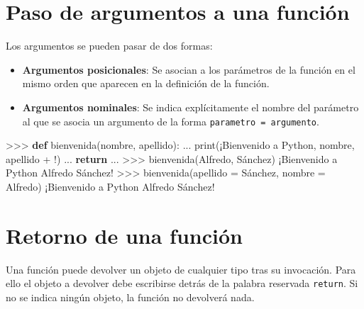 \documentclass[
  spanish,
  a4paper,
]{scrreport}
\newenvironment{Shaded}{\begin{snugshade}}{\end{snugshade}}
\newcommand{\BuiltInTok}[1]{\textcolor[rgb]{0.00,0.23,0.31}{#1}}
\newcommand{\ControlFlowTok}[1]{\textcolor[rgb]{0.00,0.23,0.31}{\textbf{#1}}}
\newcommand{\ErrorTok}[1]{\textcolor[rgb]{0.68,0.00,0.00}{#1}}
\newcommand{\KeywordTok}[1]{\textcolor[rgb]{0.00,0.23,0.31}{\textbf{#1}}}
\newcommand{\NormalTok}[1]{\textcolor[rgb]{0.00,0.23,0.31}{#1}}
\newcommand{\OperatorTok}[1]{\textcolor[rgb]{0.37,0.37,0.37}{#1}}
\newcommand{\StringTok}[1]{\textcolor[rgb]{0.13,0.47,0.30}{#1}}
\providecommand{\tightlist}{%
  \setlength{\itemsep}{0pt}\setlength{\parskip}{0pt}}
\begin{document}
\section{Paso de argumentos a una
función}\label{paso-de-argumentos-a-una-funciuxf3n}

Los argumentos se pueden pasar de dos formas:

\begin{itemize}
\tightlist
\item
  \textbf{Argumentos posicionales}: Se asocian a los parámetros de la
  función en el mismo orden que aparecen en la definición de la función.
\item
  \textbf{Argumentos nominales}: Se indica explícitamente el nombre del
  parámetro al que se asocia un argumento de la forma
  \texttt{parametro\ =\ argumento}.
\end{itemize}

\begin{Shaded}
\begin{Highlighting}[]
\OperatorTok{\textgreater{}\textgreater{}\textgreater{}} \KeywordTok{def}\NormalTok{ bienvenida(nombre, apellido):}
\NormalTok{...     }\BuiltInTok{print}\NormalTok{(}\StringTok{\textquotesingle{}¡Bienvenido a Python\textquotesingle{}}\NormalTok{, nombre, apellido }\OperatorTok{+} \StringTok{\textquotesingle{}!\textquotesingle{}}\NormalTok{)}
\NormalTok{...     }\ControlFlowTok{return}
\NormalTok{...}
\OperatorTok{\textgreater{}\textgreater{}\textgreater{}}\NormalTok{ bienvenida(}\StringTok{\textquotesingle{}Alfredo\textquotesingle{}}\NormalTok{, }\StringTok{\textquotesingle{}Sánchez)}
\ErrorTok{¡Bienvenido a Python Alfredo Sánchez!}
\OperatorTok{\textgreater{}\textgreater{}\textgreater{}}\NormalTok{ bienvenida(apellido }\OperatorTok{=} \StringTok{\textquotesingle{}Sánchez\textquotesingle{}}\NormalTok{, nombre }\OperatorTok{=} \StringTok{\textquotesingle{}Alfredo\textquotesingle{}}\NormalTok{)}
\NormalTok{¡Bienvenido a Python Alfredo Sánchez}\OperatorTok{!}
\end{Highlighting}
\end{Shaded}

\section{Retorno de una función}\label{retorno-de-una-funciuxf3n}

Una función puede devolver un objeto de cualquier tipo tras su
invocación. Para ello el objeto a devolver debe escribirse detrás de la
palabra reservada \texttt{return}. Si no se indica ningún objeto, la
función no devolverá nada.
\end{document}
